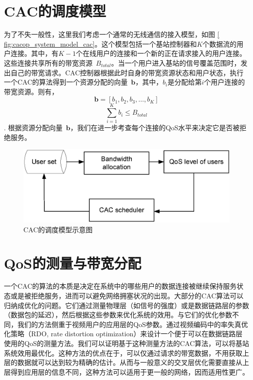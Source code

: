 \section{CAC的调度模型}
为了不失一般性，这里我们考虑一个通常的无线通信的接入模型，如图 \ref{  fig:cacop_system_model_cac}。这个模型包括一个基站控制器和$K$个数据流的用户连接。其中，有$K-1$个在线用户的连接和一个新的正在请求接入的用户连接。这些连接共享所有的带宽资源~$B_{total}$。当一个用户进入基站的信号覆盖范围时，发出自己的带宽请求。CAC控制器根据此时自身的带宽资源状态和用户状态，执行一个CAC的算法得到一个资源分配的向量~$\mathbf{b}$，其中，$b_i$是分配给第$i$个用户连接的带宽资源。则有，
$$\mathbf{b} = [ b_1, b_2, b_3, \dots, b_K]$$
$$\sum_{i=1}^K b_i \le B_{total}$$.
根据资源分配向量~$\mathbf{b}$，我们在进一步考查每个连接的QoS水平来决定它是否被拒绝服务。

\begin{figure}[tb]
\begin{centering}
\includegraphics[scale=0.7]{../figures/cacop_system_model_cac}
\caption{CAC的调度模型示意图}
\label{ fig:cacop_system_model_cac }
\end{centering}
\end{figure}

\section{QoS的测量与带宽分配}
一个CAC的算法的本质是决定在系统中的哪些用户的数据连接被继续保持服务状态或是被拒绝服务，进而可以避免网络拥塞状况的出现。大部分的CAC算法可以归纳成优化的问题。它们通过测量物理层（如信号的强度）或是数据链路层的参数（数据包的延迟），然后根据这些参数来优化系统的效用。与它们的优化参数不同，我们的方法侧重于视频用户的应用层的QoS参数。通过视频编码中的率失真优化策略（RDO, rate distortion optimization）来设计一个便于可以在数据链路层使用的QoS的测量方法。我们可以证明基于这种测量方法的CAC算法，可以将基站系统效用最优化。这种方法的优点在于，可以仅通过请求的带宽数据，不用获取上层的数据就可以达到较为精确的估计。从而与一般意义的交叉层优化需要直接从上层得到应用层的信息不同，这种方法可以适用于更一般的网络，因而适用性更广。
